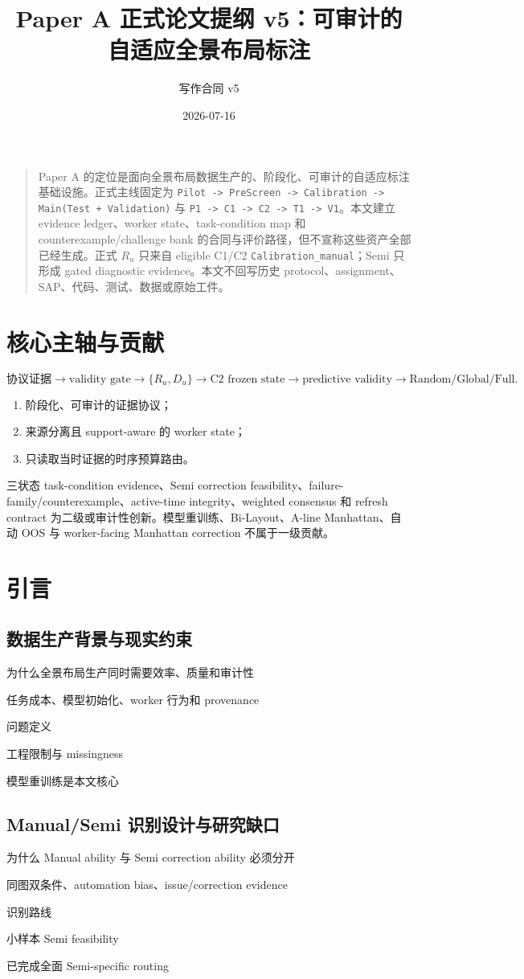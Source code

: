 \documentclass[UTF8,a4paper,12pt]{ctexart}
\title{Paper A 正式论文提纲 v5：可审计的自适应全景布局标注}
\author{写作合同 v5}
\date{2026-07-16}
\newcommand{\card}[5]{%
  \begin{description}[leftmargin=3.3cm,style=nextline]
    \item[回答什么问题：]#1
    \item[使用什么证据：]#2
    \item[Primary：]#3
    \item[Sensitivity / audit：]#4
    \item[禁止主张：]#5
  \end{description}}
\begin{document}
\maketitle

\begin{quote}
Paper A 的定位是面向全景布局数据生产的、阶段化、可审计的自适应标注基础设施。正式主线固定为
\texttt{Pilot -> PreScreen -> Calibration -> Main(Test + Validation)} 与
\texttt{P1 -> C1 -> C2 -> T1 -> V1}。本文建立 evidence ledger、worker state、task-condition map 和 counterexample/challenge bank 的合同与评价路径，但不宣称这些资产全部已经生成。正式 $R_u$ 只来自 eligible C1/C2 \texttt{Calibration\_manual}；Semi 只形成 gated diagnostic evidence。本文不回写历史 protocol、assignment、SAP、代码、测试、数据或原始工件。
\end{quote}

\section*{核心主轴与贡献}
\[
\text{协议证据}\to\text{validity gate}\to
\{R_u,D_u\}\to\text{C2 frozen state}\to
\text{predictive validity}\to\text{Random/Global/Full}.
\]
\begin{enumerate}
  \item 阶段化、可审计的证据协议；
  \item 来源分离且 support-aware 的 worker state；
  \item 只读取当时证据的时序预算路由。
\end{enumerate}
三状态 task-condition evidence、Semi correction feasibility、failure-family/counterexample、active-time integrity、weighted consensus 和 refresh contract 为二级或审计性创新。模型重训练、Bi-Layout、A-line Manhattan、自动 OOS 与 worker-facing Manhattan correction 不属于一级贡献。

\section{引言}
\subsection{数据生产背景与现实约束}
\card{为什么全景布局生产同时需要效率、质量和审计性}{任务成本、模型初始化、worker 行为和 provenance}{问题定义}{工程限制与 missingness}{模型重训练是本文核心}
\subsection{Manual/Semi 识别设计与研究缺口}
\card{为什么 Manual ability 与 Semi correction ability 必须分开}{同图双条件、automation bias、issue/correction evidence}{识别路线}{小样本 Semi feasibility}{已完成全面 Semi-specific routing}
\end{document}
